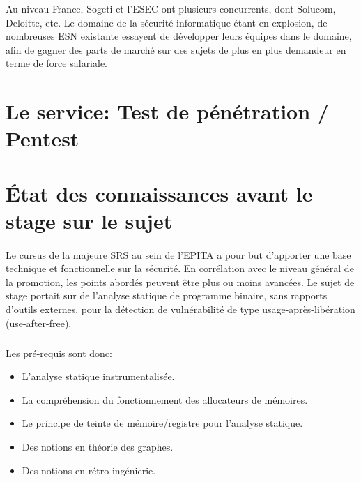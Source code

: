 Au niveau France, Sogeti et l'ESEC ont plusieurs concurrents, dont Solucom, Deloitte,
etc. Le domaine de la sécurité informatique étant en explosion, de nombreuses ESN existante
essayent de développer leurs équipes dans le domaine, afin de gagner des parts de marché
sur des sujets de plus en plus demandeur en terme de force salariale.


\paragraph{}
\subparagraph{}
\section*{Le service: Test de pénétration / Pentest}

\subparagraph{}

\section*{État des connaissances avant le stage sur le sujet}
\paragraph{}
Le cursus de la majeure SRS au sein de l'EPITA a pour but d'apporter une base technique et fonctionnelle
sur la sécurité. En corrélation avec le niveau général de la promotion, les points abordés peuvent être
plus ou moins avancées. Le sujet de stage portait sur de l'analyse statique de programme binaire, sans rapports
d'outils externes, pour la détection de vulnérabilité de type usage-après-libération (use-after-free).
\subparagraph{}
Les pré-requis sont donc:
\begin{itemize}
\item L'analyse statique instrumentalisée.
\item La compréhension du fonctionnement des allocateurs de mémoires.
\item Le principe de teinte de mémoire/registre pour l'analyse statique.
\item Des notions en théorie des graphes.
\item Des notions en rétro ingénierie.
\end{itemize}

